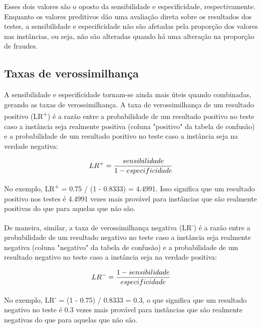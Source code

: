 Esses dois valores são o oposto da sensibilidade e especificidade, respectivamente. Enquanto os valores preditivos dão uma avaliação direta sobre os resultados dos testes, a sensibilidade e especificidade não são afetadas pela proporção dos valores nas instâncias, ou seja, não são alteradas quando há uma alteração na proporção de fraudes.

\subsection{Taxas de verossimilhança}

A sensibilidade e especificidade tornam-se ainda mais úteis quando combinadas, gerando as taxas de verossimilhança. A taxa de verossimilhança de um resultado positivo (LR\textsuperscript{+}) é a razão entre a probabilidade de um resultado positivo no teste caso a instância seja realmente positiva (coluna "positivo" da tabela de confusão) e a probabilidade de um resultado positivo no teste caso a instância seja na verdade negativa:

\begin{equation}
    \vspace{2mm}
    LR^{+}=\frac{sensibilidade}{1 - especificidade}
    \vspace{2mm}
\end{equation}

No exemplo, LR\textsuperscript{+} = 0.75 / (1 - 0.8333) = 4.4991. Isso significa que um resultado positivo nos testes é 4.4991 vezes mais provável para instâncias que são realmente positivas do que para aquelas que não são.

De maneira, similar, a taxa de verossimilhança negativa (LR\textsuperscript{-}) é a razão entre a probabilidade de um resultado negativo no teste caso a instância seja realmente negativa (coluna "negativo" da tabela de confusão) e a probabilidade de um resultado negativo no teste caso a instância seja na verdade positiva:

\begin{equation}
    \vspace{2mm}
    LR^{-}=\frac{1 - sensibilidade}{especificidade}
    \vspace{2mm}
\end{equation}

No exemplo, LR\textsuperscript{-} = (1 - 0.75) / 0.8333 = 0.3, o que significa que um resultado negativo no teste é 0.3 vezes mais provável para instâncias que são realmente negativas do que para aquelas que não são.

